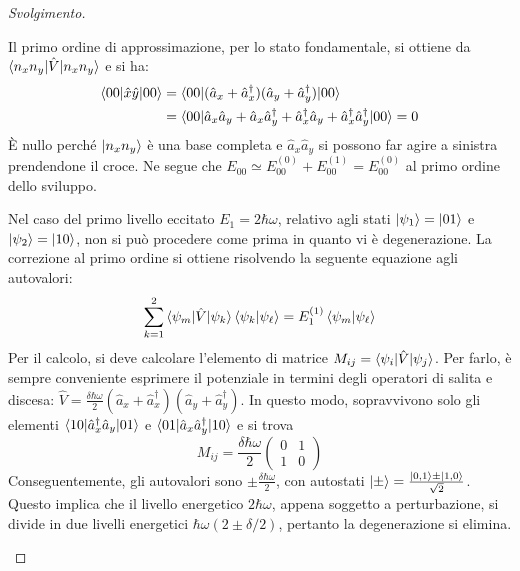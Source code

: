 \documentclass[11pt, a4paper]{scrartcl} %
\numberwithin{equation}{subsection}
\theoremstyle{style2}
\theoremstyle{style1}
\renewcommand\qedsymbol{$\blacksquare$}
\newenvironment{svolgimento}{\renewcommand\qedsymbol{$\spadesuit$}\begin{proof}[Svolgimento]}{\end{proof}}
\begin{document}
\begin{svolgimento}
\begin{enumerate}[(a).]
	Il primo ordine di approssimazione, per lo stato fondamentale, si ottiene da $\braket{n_xn_y|\hat{V}|n_x n_y} $ e si ha:
	\[
	\begin{split}
		\braket{00|\hat{x}\hat{y}|00} &= \braket{00|(\hat{a}_x + \hat{a}_x^\dagger ) (\hat{a}_y + \hat{a}_y ^\dagger )|00} \\
					      &= \braket{00|\hat{a}_x \hat{a}_y + \hat{a}_x \hat{a}_y ^\dagger  +\hat{a}_x^\dagger \hat{a}_y + \hat{a}_x^\dagger  \hat{a}_y^\dagger |00} =0
	\end{split}
	\] 
	\`E nullo perch\'e $\ket{n_xn_y} $ \`e una base completa e $\hat{a}_x\hat{a}_y$ si possono far agire a sinistra prendendone il croce.
	Ne segue che $E_{00} \simeq  E_{00} ^{(0)} + E^{(1)} _{00} = E_{00} ^{(0)} $ al primo ordine dello sviluppo.

	Nel caso del primo livello eccitato $E_1 = 2\hbar \omega$, relativo agli stati $\ket{\psi _1} =\ket{01}$ e $\ket{\psi _2} = \ket{10} $, non si pu\`o procedere come prima in quanto vi \`e degenerazione.
	La correzione al primo ordine si ottiene risolvendo la seguente equazione agli autovalori:
	\[
	\sum_{k=1}^{2} \braket{\psi _m|\hat{V}|\psi _k} \braket{\psi _k|\psi _\ell } = E_1^{(1)} \braket{\psi _m|\psi _\ell } 
	\] 
	Per il calcolo, si deve calcolare l'elemento di matrice $M_{ij} = \braket{\psi _i|\hat{V}|\psi _j} $.
	Per farlo, \`e sempre conveniente esprimere il potenziale in termini degli operatori di salita e discesa: $\hat{V} = \frac{\delta \hbar \omega}{2}(\hat{a}_x + \hat{a}^\dagger _x)(\hat{a}_y + \hat{a}_y^\dagger )$.
In questo modo, sopravvivono solo gli elementi $\braket{10|\hat{a}_x^\dagger \hat{a}_y|01} $ e $\braket{01|\hat{a}_x \hat{a}_y^\dagger |10} $ e si trova
\[
	M_{ij} = \frac{\delta \hbar \omega}{2} \begin{pmatrix} 0 & 1 \\ 1 & 0  \end{pmatrix} 
\] 
Conseguentemente, gli autovalori sono $\pm \frac{\delta \hbar \omega}{2}$, con autostati $\ket{\pm} = \frac{\ket{0,1} \pm \ket{1,0} }{\sqrt{2} }$.
Questo implica che il livello energetico $2 \hbar \omega$, appena soggetto a perturbazione, si divide in due livelli energetici $\hbar \omega (2\pm \delta  / 2)$, pertanto la degenerazione si elimina.


\end{enumerate}
\end{svolgimento}
\end{document}
